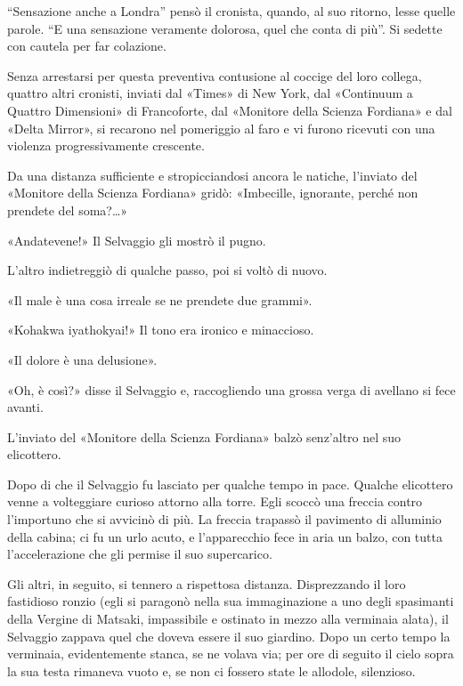 \documentclass[
a5paper, %
10pt, %
twoside, 
onecolumn, %
openany, %
]{memoir}
\begin{document}
“Sensazione anche a Londra” pensò il cronista, quando, al suo ritorno, lesse quelle parole. “E una sensazione veramente dolorosa, quel che conta di più”. Si sedette con cautela per far colazione.

Senza arrestarsi per questa preventiva contusione al coccige del loro collega, quattro altri cronisti, inviati dal «Times» di New York, dal «Continuum a Quattro Dimensioni» di Francoforte, dal «Monitore della Scienza Fordiana» e dal «Delta Mirror», si recarono nel pomeriggio al faro e vi furono ricevuti con una violenza progressivamente crescente.

Da una distanza sufficiente e stropicciandosi ancora le natiche, l’inviato del «Monitore della Scienza Fordiana» gridò: «Imbecille, ignorante, perché non prendete del soma?…»

«Andatevene!» Il Selvaggio gli mostrò il pugno.

L’altro indietreggiò di qualche passo, poi si voltò di nuovo.

«Il male è una cosa irreale se ne prendete due grammi».

«Kohakwa iyathokyai!» Il tono era ironico e minaccioso.

«Il dolore è una delusione».

«Oh, è così?» disse il Selvaggio e, raccogliendo una grossa verga di avellano si fece avanti.

L’inviato del «Monitore della Scienza Fordiana» balzò senz’altro nel suo elicottero.

Dopo di che il Selvaggio fu lasciato per qualche tempo in pace. Qualche elicottero venne a volteggiare curioso attorno alla torre. Egli scoccò una freccia contro l’importuno che si avvicinò di più. La freccia trapassò il pavimento di alluminio della cabina; ci fu un urlo acuto, e l’apparecchio fece in aria un balzo, con tutta l’accelerazione che gli permise il suo supercarico.

Gli altri, in seguito, si tennero a rispettosa distanza. Disprezzando il loro fastidioso ronzio (egli si paragonò nella sua immaginazione a uno degli spasimanti della Vergine di Matsaki, impassibile e ostinato in mezzo alla verminaia alata), il Selvaggio zappava quel che doveva essere il suo giardino. Dopo un certo tempo la verminaia, evidentemente stanca, se ne volava via; per ore di seguito il cielo sopra la sua testa rimaneva vuoto e, se non ci fossero state le allodole, silenzioso.
\end{document}
